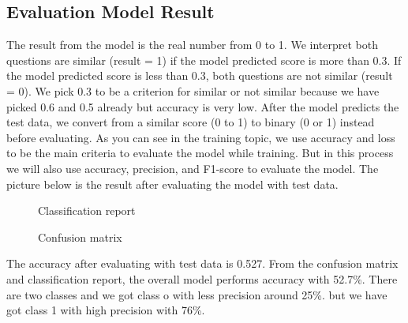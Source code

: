 \documentclass[12pt,oneside,openright,a4paper]{cpe-english-project}
\begin{document}
\subsection{Evaluation Model Result}
The result from the model is the real number from 0 to 1. We interpret both questions are similar (result = 1) if the model predicted score is more than 0.3. If the model predicted score is less than 0.3, both questions are not similar (result = 0). We pick 0.3 to be a criterion for similar or not similar because we have picked 0.6 and 0.5 already but accuracy is very low. After the model predicts the test data, we convert from a similar score (0 to 1)  to binary (0 or 1) instead before evaluating. As you can see in the training topic, we use accuracy and loss to be the main criteria to evaluate the model while training. But in this process we will also use accuracy, precision, and F1-score to evaluate the model. The picture below is the result after evaluating the model with test data.

\begin{figure}[!h]\centering
{}
\caption{Classification report}\label{fig:Classification report}
\end{figure}
\begin{figure}[!h]\centering
{}
\caption{Confusion matrix}\label{fig:Confusion matrix}
\end{figure}

The accuracy after evaluating with test data is 0.527. From the confusion matrix and classification report, the overall model performs accuracy with 52.7\%. There are two classes and we got class o with less precision around 25\%. but we have got class 1 with high precision with 76\%.
\end{document}

